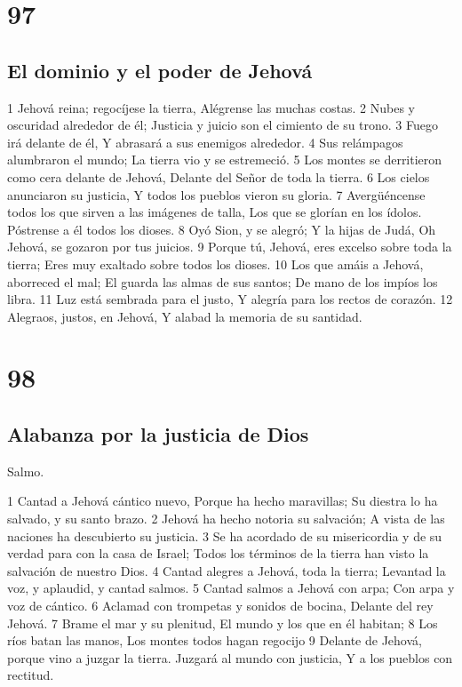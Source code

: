 \chapter{97}

\section*{El dominio y el poder de Jehová}

1 Jehová reina; regocíjese la tierra,
Alégrense las muchas costas.
2 Nubes y oscuridad alrededor de él;
Justicia y juicio son el cimiento de su trono.
3 Fuego irá delante de él,
Y abrasará a sus enemigos alrededor.
4 Sus relámpagos alumbraron el mundo;
La tierra vio y se estremeció.
5 Los montes se derritieron como cera delante de Jehová,
Delante del Señor de toda la tierra.
6 Los cielos anunciaron su justicia,
Y todos los pueblos vieron su gloria.
7 Avergüéncense todos los que sirven a las imágenes de talla,
Los que se glorían en los ídolos.
Póstrense a él todos los dioses.
8 Oyó Sion, y se alegró;
Y la hijas de Judá,
Oh Jehová, se gozaron por tus juicios.
9 Porque tú, Jehová, eres excelso sobre toda la tierra;
Eres muy exaltado sobre todos los dioses.
10 Los que amáis a Jehová, aborreced el mal;
El guarda las almas de sus santos;
De mano de los impíos los libra.
11 Luz está sembrada para el justo,
Y alegría para los rectos de corazón.
12 Alegraos, justos, en Jehová,
Y alabad la memoria de su santidad.

\chapter{98}

\section*{Alabanza por la justicia de Dios}

Salmo.

1 Cantad a Jehová cántico nuevo,
Porque ha hecho maravillas;
Su diestra lo ha salvado, y su santo brazo.
2 Jehová ha hecho notoria su salvación;
A vista de las naciones ha descubierto su justicia.
3 Se ha acordado de su misericordia y de su verdad para con la casa de Israel;
Todos los términos de la tierra han visto la salvación de nuestro Dios.
4 Cantad alegres a Jehová, toda la tierra;
Levantad la voz, y aplaudid, y cantad salmos.
5 Cantad salmos a Jehová con arpa;
Con arpa y voz de cántico.
6 Aclamad con trompetas y sonidos de bocina,
Delante del rey Jehová.
7 Brame el mar y su plenitud,
El mundo y los que en él habitan;
8 Los ríos batan las manos,
Los montes todos hagan regocijo
9 Delante de Jehová, porque vino a juzgar la tierra.
Juzgará al mundo con justicia,
Y a los pueblos con rectitud.

